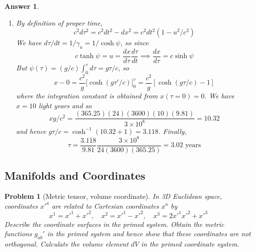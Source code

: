\documentclass[a4paper]{article}
\theoremstyle{new2}
\newtheorem{ans}{Answer}[section]
\theoremstyle{new}
\newtheorem{qns}{Problem}[section]
\begin{document}
\begin{ans}
\begin{enumerate}[label=(\alph*)]
\item By definition of proper time,
$$c^2d\tau^2=c^2dt^2-dx^2=c^2dt^2(1-u^2/c^2)$$
We have $d\tau/dt=1/\gamma_u=1/\cosh\psi$, so since
$$c\tanh\psi=u=\frac{dx}{d\tau}\frac{d\tau}{dt}\implies\frac{dx}{d\tau}=c\sinh\psi$$
But $\psi(\tau)=(g/c)\int_0^\tau d\tau=g\tau/c$, so
$$x-0=\frac{c^2}{g}\bigg[\cosh(g\tau'/c)\bigg]^{\tau}_0=\frac{c^2}{g}[\cosh(g\tau/c)-1]$$
where the integration constant is obtained from $x(\tau=0)=0$. We have $x=10$ light years and so
$$xg/c^2=\frac{(365.25)(24)(3600)(10)(9.81)}{3\times10^8}=10.32$$
and hence $g\tau/c=\cosh^{-1}(10.32+1)=3.118$. Finally,
$$\tau=\frac{3.118}{9.81}\frac{3\times10^8}{24(3600)(365.25)}=3.02\text{ years}$$
\end{enumerate}
\end{ans}
\newpage
\subsection*{Manifolds and Coordinates}
\begin{qns}[Metric tensor, volume coordinate]
In 3D Euclidean space, coordinates $x'^a$ are related to Cartesian coordinates $x^a$ by
$$x^1=x'^1+x'^2,\quad  x^2=x'^1-x'^2,\quad x^3=2x'^1x'^2+x'^3$$
Describe the coordinate surfaces in the primed system. Obtain the metric functions $g_{ab}'$ in the primed system and hence show that these coordinates are not orthogonal. Calculate the volume element $dV$ in the primed coordinate system.
\end{qns}
\end{document}
